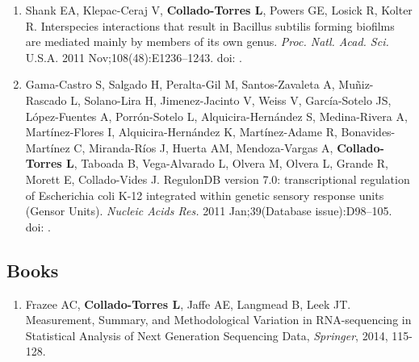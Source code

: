 \begin{enumerate}
        \item Shank EA, Klepac-Ceraj V, \textbf{Collado-Torres L}, Powers GE, Losick R, Kolter R. Interspecies interactions that result in Bacillus subtilis forming biofilms are mediated mainly by members of its own genus. \emph{Proc. Natl. Acad. Sci.} U.S.A. 2011 Nov;108(48):E1236–1243. doi: .
        
        \item Gama-Castro S, Salgado H, Peralta-Gil M, Santos-Zavaleta A, Muñiz-Rascado L, Solano-Lira H, Jimenez-Jacinto V, Weiss V, Garc\'ia-Sotelo JS, L\'opez-Fuentes A, Porr\'on-Sotelo L, Alquicira-Hern\'andez S, Medina-Rivera A, Mart\'inez-Flores I, Alquicira-Hern\'andez K, Mart\'inez-Adame R, Bonavides-Mart\'inez C, Miranda-R\'ios J, Huerta AM, Mendoza-Vargas A, \textbf{Collado-Torres L}, Taboada B, Vega-Alvarado L, Olvera M, Olvera L, Grande R, Morett E, Collado-Vides J. RegulonDB version 7.0: transcriptional regulation of Escherichia coli K-12 integrated within genetic sensory response units (Gensor Units). \emph{Nucleic Acids Res.} 2011 Jan;39(Database issue):D98–105. doi: .
    \end{enumerate}
\subsection{Books}
    \begin{enumerate}
        \item Frazee AC, \textbf{Collado-Torres L}, Jaffe AE, Langmead B, Leek JT. Measurement, Summary, and Methodological Variation in RNA-sequencing in Statistical Analysis of Next Generation Sequencing Data, \emph{Springer}, 2014, 115-128.
    \end{enumerate}

